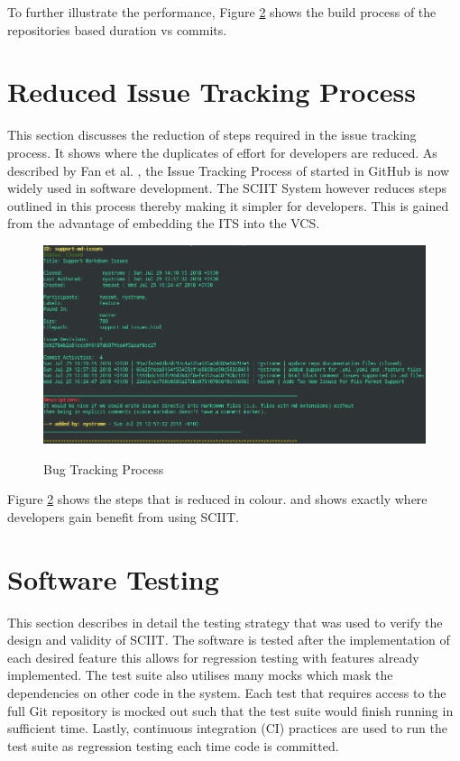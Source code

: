\documentclass{mproj}
\begin{document}
To further illustrate the performance, Figure \ref{} shows the build process of the repositories based duration vs commits.

\section{Reduced Issue Tracking Process}

This section discusses the reduction of steps required in the issue tracking process. It shows where the duplicates of effort for developers are reduced. As described by Fan et al. \cite{Fan:2017}, the Issue Tracking Process of started in GitHub is now widely used in software development. The SCIIT System however reduces steps outlined in this process thereby making it simpler for developers. This is gained from the advantage of embedding the ITS into the VCS.

\begin{figure}
\centering
  \caption{Bug Tracking Process}
  \includegraphics[width=15cm]{sciit-tracker-shot}
  \label{fig:sciit-tracker-shot}
\end{figure}
Figure \ref{} shows the steps that is reduced in colour. and shows exactly where developers gain benefit from using SCIIT. 

\section{Software Testing} %

This section describes in detail the testing strategy that was used to verify the design and validity of SCIIT. The software is tested after the implementation of each desired feature this allows for regression testing with features already implemented. The test suite also utilises many mocks which mask the dependencies on other code in the system. Each test that requires access to the full Git repository is mocked out such that the test suite would finish running in sufficient time. Lastly, continuous integration (CI) practices are used to run the test suite as regression testing each time code is committed.
\end{document}
